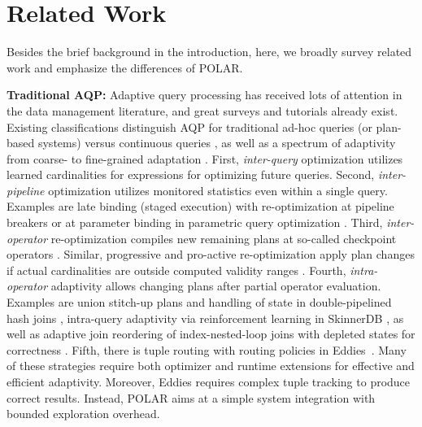 \vspace{0.4cm}
\section{Related Work}
\label{related-work}
%
Besides the brief background in the introduction, here, we broadly survey related work and emphasize the differences of POLAR.

\textbf{Traditional AQP:} Adaptive query processing has received lots of attention in the data management literature, and great surveys \cite{BabuB05,DeshpandeIR07} and tutorials \cite{IvesDR07,DeshpandeHR06} already exist. Existing classifications distinguish AQP for traditional ad-hoc queries (or plan-based systems) versus continuous queries \cite{BabuB05}, as well as a spectrum of adaptivity from coarse- to fine-grained adaptation \cite{DeshpandeHR06}.
First, \emph{inter-query} optimization utilizes learned cardinalities for expressions \cite{BrunoC02,ChenR94,StillgerLMK01} for optimizing future queries. Second, \emph{inter-pipeline} optimization utilizes monitored statistics even within a single query. Examples are late binding (staged execution) with re-optimization at pipeline breakers \cite{DeshpandeHR06} or at parameter binding in parametric query optimization \cite{BizarroBD09}. Third, \emph{inter-operator} re-optimization compiles new remaining plans at so-called checkpoint operators \cite{KabraD98}. Similar, progressive and pro-active re-optimization apply plan changes if actual cardinalities are outside computed validity ranges \cite{MarklRSLP04,BabuBD05}. Fourth, \emph{intra-operator} adaptivity allows changing plans after partial operator evaluation. Examples are union stitch-up plans and handling of state in double-pipelined hash joins \cite{IvesHW04}, intra-query adaptivity via reinforcement learning in SkinnerDB \cite{TrummerWMMJA19,TrummerWWMMJAR21,WeiT22}, as well as adaptive join reordering of index-nested-loop joins with depleted states for correctness \cite{LiSMBCL07}. Fifth, there is tuple routing with routing policies in Eddies~\cite{HellersteinA00,Arpaci-Dusseau03,Deshpande04,BizarroBDW05}. Many of these strategies require both optimizer and runtime extensions for effective and efficient adaptivity. Moreover, Eddies requires complex tuple tracking to produce correct results. Instead, POLAR aims at a simple system integration with bounded exploration overhead.


